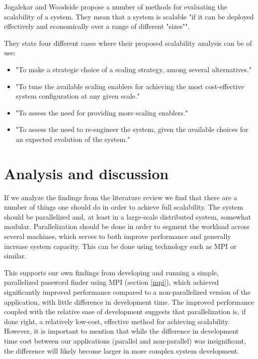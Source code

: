 \documentclass{article}
\begin{document}
Jogalekar and Woodside \cite{jogalekar2000evaluating} propose a number of
methods for evaluating the scalability of a system. They mean that a system is
scalable "if it can be deployed effectively and economically over a range of
different "sizes"". 

They state four different cases where their proposed scalability analysis can
be of use:
\begin{itemize}
\item{"To make a strategic choice of a scaling strategy, among several
alternatives."}
\item{"To tune the available scaling enablers for achieving the most
cost-effective system configuration at any given scale."}
\item{"To assess the need for providing more scaling enablers."}
\item{"To assess the need to re-engineer the system, given the available choices
for an expected evolution of the system."}
\end{itemize}


\section{Analysis and discussion}

If we analyze the findings from the literature review we find that there are a
number of things one should do in order to achieve full scalability.  The
system should be parallelized and, at least in a large-scale distributed
system, somewhat modular. Parallelization should be done in order to segment
the workload across several machines, which serves to both improve performance
and generally increase system
capacity\cite{fayad2005towards}\cite{haggander1999guidelines}\cite{caruso1997toward}.
This can be done using technology such as
MPI\cite{gropp1996high}\cite{miller2002pympi}\cite{millerparallel} or similar.

This supports our own findings from developing and running a simple,
parallelized password finder using MPI (section \ref{mpi}), which achieved
significantly improved performance compared to a non-parallelized version of
the application, with little difference in development time. The improved
performance coupled with the relative ease of development suggests that
parallelization is, if done right, a relatively low-cost, effective method for
achieving scalability. However, it is important to mention that while the
difference in development time cost between our applications (parallel and
non-parallel) was insignificant, the difference will likely become larger in
more complex system development.
\end{document}
